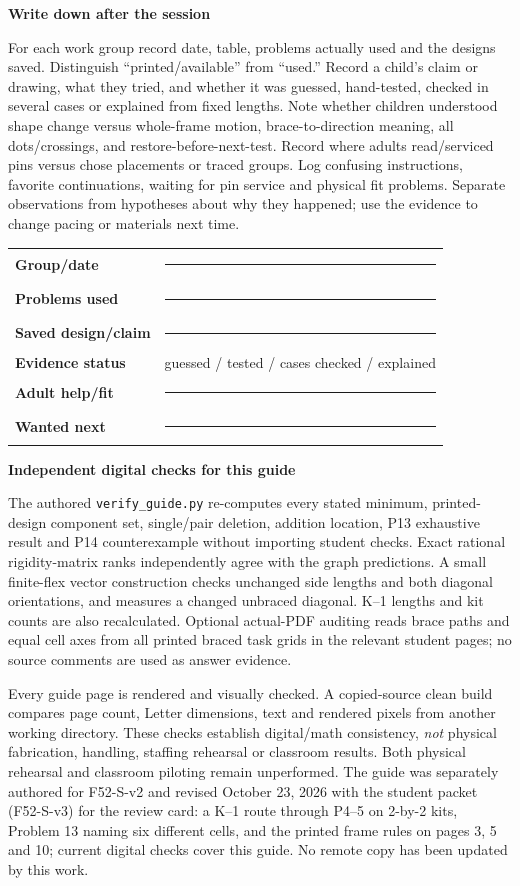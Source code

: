 \documentclass[letterpaper,11pt]{article}
\newcommand{\sub}[1]{\par\textbf{#1}\par}
\begin{document}
\sub{Write down after the session}
For each work group record date, table, problems actually used and the designs saved. Distinguish ``printed/available'' from ``used.'' Record a child's claim or drawing, what they tried, and whether it was guessed, hand-tested, checked in several cases or explained from fixed lengths. Note whether children understood shape change versus whole-frame motion, brace-to-direction meaning, all dots/crossings, and restore-before-next-test. Record where adults read/serviced pins versus chose placements or traced groups. Log confusing instructions, favorite continuations, waiting for pin service and physical fit problems. Separate observations from hypotheses about why they happened; use the evidence to change pacing or materials next time.

\begin{tabularx}{\linewidth}{@{}lX@{}}\textbf{Group/date} & \rule{.8\linewidth}{.3pt}\\[8pt]
\textbf{Problems used} & \rule{.8\linewidth}{.3pt}\\[8pt]
\textbf{Saved design/claim} & \rule{.8\linewidth}{.3pt}\\[8pt]
\textbf{Evidence status} & guessed / tested / cases checked / explained\\[8pt]
\textbf{Adult help/fit} & \rule{.8\linewidth}{.3pt}\\[8pt]
\textbf{Wanted next} & \rule{.8\linewidth}{.3pt}
\end{tabularx}

\sub{Independent digital checks for this guide}
The authored \texttt{verify\_guide.py} re-computes every stated minimum, printed-design component set, single/pair deletion, addition location, P13 exhaustive result and P14 counterexample without importing student checks. Exact rational rigidity-matrix ranks independently agree with the graph predictions. A small finite-flex vector construction checks unchanged side lengths and both diagonal orientations, and measures a changed unbraced diagonal. K--1 lengths and kit counts are also recalculated. Optional actual-PDF auditing reads brace paths and equal cell axes from all printed braced task grids in the relevant student pages; no source comments are used as answer evidence.

Every guide page is rendered and visually checked. A copied-source clean build compares page count, Letter dimensions, text and rendered pixels from another working directory. These checks establish digital/math consistency, \emph{not} physical fabrication, handling, staffing rehearsal or classroom results. Both physical rehearsal and classroom piloting remain unperformed. The guide was separately authored for F52-S-v2 and revised October 23, 2026 with the student packet (F52-S-v3) for the review card: a K--1 route through P4--5 on 2-by-2 kits, Problem 13 naming six different cells, and the printed frame rules on pages 3, 5 and 10; current digital checks cover this guide. No remote copy has been updated by this work.
\end{document}

